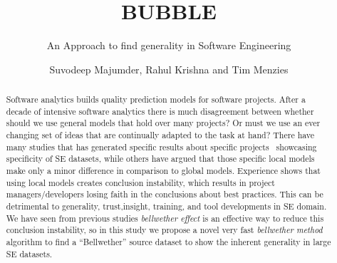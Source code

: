 \documentclass[sigconf]{acmart}
\theoremstyle{break}
\begin{document}



\title{BUBBLE}
\subtitle{An Approach to find generality in Software Engineering}

\author{Suvodeep Majumder, Rahul Krishna and Tim Menzies}


\begin{abstract}
Software analytics builds quality prediction models for software projects. After a decade of intensive software analytics there is much disagreement between whether should we use general models that hold over many projects? Or must we use an ever changing set of ideas that are continually adapted to the task at hand? There have many studies that has generated specific results about specific projects~\cite{Bird:2015, menzies2013software} showcasing specificity of SE datasets, while others have argued that those specific local models make only a minor difference in comparison to global models. Experience shows that using local models creates conclusion instability, which results in project managers/developers losing faith in the conclusions about best practices. This can be detrimental to generality, trust,insight, training, and tool developments in SE domain. We have seen from previous studies \textit{bellwether effect}  is an effective way to reduce this conclusion instability, so in this study we propose a novel very fast \textit{bellwether method} algorithm to find a ``Bellwether'' source dataset to show the inherent generality in large SE datasets.

\end{abstract}


\end{document}
